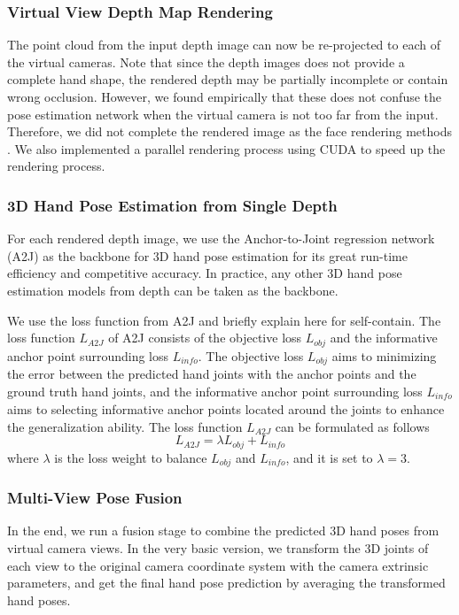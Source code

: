 \documentclass[letterpaper]{article} \usepackage{aaai22}  \usepackage{times}  \usepackage{helvet}  \usepackage{courier}  \usepackage[hyphens]{url}  \usepackage{graphicx} \urlstyle{rm} \def\UrlFont{\rm}  \usepackage{natbib}  \usepackage{caption} \DeclareCaptionStyle{ruled}{labelfont=normalfont,labelsep=colon,strut=off} \frenchspacing  \setlength{\pdfpagewidth}{8.5in}  \setlength{\pdfpageheight}{11in}  \usepackage{algorithm}
\begin{document}
\subsubsection{Virtual View Depth Map Rendering}
The point cloud from the input depth image can now be re-projected to each of the virtual cameras.
Note that since the depth images does not provide a complete hand shape, the rendered depth may be partially incomplete or contain wrong occlusion.
However, we found empirically that these does not confuse the pose estimation network when the virtual camera is not too far from the input. Therefore, we did not complete the rendered image as the face rendering methods \cite{zhou2020rotate, fu2021high}.
We also implemented a parallel rendering process using CUDA to speed up the rendering process. 

\subsubsection{3D Hand Pose Estimation from Single Depth}
For each rendered depth image, we use the Anchor-to-Joint regression network (A2J) \cite{xiong2019a2j} as the backbone for 3D hand pose estimation for its great run-time efficiency and competitive accuracy.
In practice, any other 3D hand pose estimation models from depth can be taken as the backbone. 

We use the loss function from A2J and briefly explain here for self-contain. The loss function $L_{\textit{A2J}}$ of A2J consists of the objective loss $L_{\textit{obj}}$ and the informative anchor point surrounding loss $L_{\textit{info}}$. The objective loss $L_{\textit{obj}}$ aims to minimizing the error between the predicted hand joints with the anchor points and the ground truth hand joints, and the informative anchor point surrounding loss $L_{\textit{info}}$ aims to selecting informative anchor points located around the joints to enhance the generalization ability. The loss function $L_{\textit{A2J}}$ can be formulated as follows
\begin{equation}
\label{eq:a2j_loss}
L_{\textit{A2J}}=\lambda L_{\textit{obj}} + L_{\textit{info}}
\end{equation}
where $\lambda$ is the loss weight to balance $L_{\textit{obj}}$ and $L_{\textit{info}}$, and it is set to $\lambda=3$.

\subsubsection{Multi-View Pose Fusion}
In the end, we run a fusion stage to combine the predicted 3D hand poses from virtual camera views.
In the very basic version, 
we transform the 3D joints of each view to the original camera coordinate system with the camera extrinsic parameters, and get the final hand pose prediction by averaging the transformed hand poses.
\end{document}
